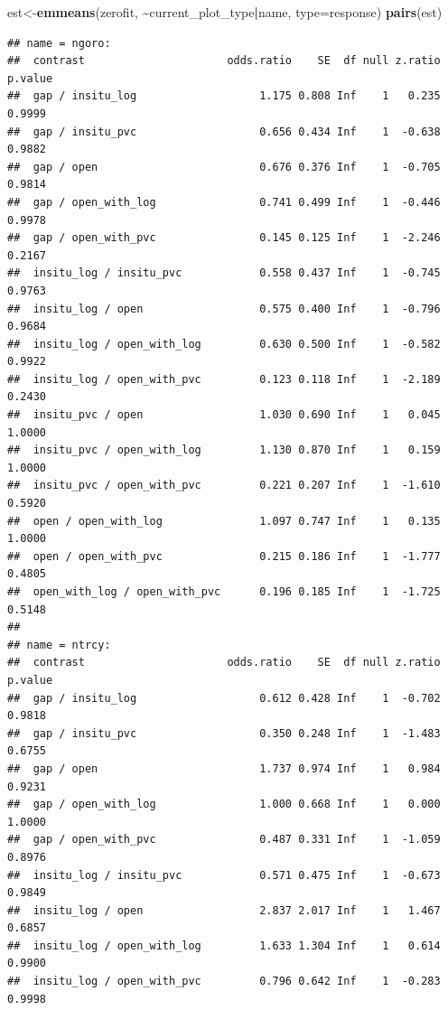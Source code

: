 \documentclass[
]{article}
\newenvironment{Shaded}{\begin{snugshade}}{\end{snugshade}}
\newcommand{\AttributeTok}[1]{\textcolor[rgb]{0.13,0.29,0.53}{#1}}
\newcommand{\FunctionTok}[1]{\textcolor[rgb]{0.13,0.29,0.53}{\textbf{#1}}}
\newcommand{\NormalTok}[1]{#1}
\newcommand{\OtherTok}[1]{\textcolor[rgb]{0.56,0.35,0.01}{#1}}
\newcommand{\SpecialCharTok}[1]{\textcolor[rgb]{0.81,0.36,0.00}{\textbf{#1}}}
\newcommand{\StringTok}[1]{\textcolor[rgb]{0.31,0.60,0.02}{#1}}
\begin{document}
\begin{Shaded}
\begin{Highlighting}[]
\NormalTok{est}\OtherTok{\textless{}{-}}\FunctionTok{emmeans}\NormalTok{(zerofit, }\SpecialCharTok{\textasciitilde{}}\NormalTok{current\_plot\_type}\SpecialCharTok{|}\NormalTok{name, }\AttributeTok{type=}\StringTok{\textquotesingle{}response\textquotesingle{}}\NormalTok{)}
\FunctionTok{pairs}\NormalTok{(est)}
\end{Highlighting}
\end{Shaded}

\begin{verbatim}
## name = ngoro:
##  contrast                      odds.ratio    SE  df null z.ratio p.value
##  gap / insitu_log                   1.175 0.808 Inf    1   0.235  0.9999
##  gap / insitu_pvc                   0.656 0.434 Inf    1  -0.638  0.9882
##  gap / open                         0.676 0.376 Inf    1  -0.705  0.9814
##  gap / open_with_log                0.741 0.499 Inf    1  -0.446  0.9978
##  gap / open_with_pvc                0.145 0.125 Inf    1  -2.246  0.2167
##  insitu_log / insitu_pvc            0.558 0.437 Inf    1  -0.745  0.9763
##  insitu_log / open                  0.575 0.400 Inf    1  -0.796  0.9684
##  insitu_log / open_with_log         0.630 0.500 Inf    1  -0.582  0.9922
##  insitu_log / open_with_pvc         0.123 0.118 Inf    1  -2.189  0.2430
##  insitu_pvc / open                  1.030 0.690 Inf    1   0.045  1.0000
##  insitu_pvc / open_with_log         1.130 0.870 Inf    1   0.159  1.0000
##  insitu_pvc / open_with_pvc         0.221 0.207 Inf    1  -1.610  0.5920
##  open / open_with_log               1.097 0.747 Inf    1   0.135  1.0000
##  open / open_with_pvc               0.215 0.186 Inf    1  -1.777  0.4805
##  open_with_log / open_with_pvc      0.196 0.185 Inf    1  -1.725  0.5148
## 
## name = ntrcy:
##  contrast                      odds.ratio    SE  df null z.ratio p.value
##  gap / insitu_log                   0.612 0.428 Inf    1  -0.702  0.9818
##  gap / insitu_pvc                   0.350 0.248 Inf    1  -1.483  0.6755
##  gap / open                         1.737 0.974 Inf    1   0.984  0.9231
##  gap / open_with_log                1.000 0.668 Inf    1   0.000  1.0000
##  gap / open_with_pvc                0.487 0.331 Inf    1  -1.059  0.8976
##  insitu_log / insitu_pvc            0.571 0.475 Inf    1  -0.673  0.9849
##  insitu_log / open                  2.837 2.017 Inf    1   1.467  0.6857
##  insitu_log / open_with_log         1.633 1.304 Inf    1   0.614  0.9900
##  insitu_log / open_with_pvc         0.796 0.642 Inf    1  -0.283  0.9998

\end{verbatim}
\end{document}
